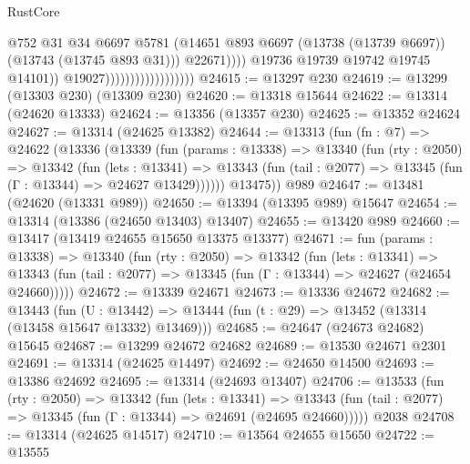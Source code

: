 \begin{lexlean}{RustCore}
\begin{coremodule}
                                                    @752
                                                    @31
                                                    @34
                                                    @6697
                                                    @5781
                                                    (@14651
                                                      @893
                                                      @6697
                                                      (@13738 (@13739 @6697))
                                                      (@13743 (@13745 @893 @31)))
                                                    @22671))))
                                            @19736
                                            @19739
                                            @19742
                                            @19745
                                            @14101))
                                        @19027))))))))))))))))))
@24615 := @13297 @230
@24619 := @13299 (@13303 @230) (@13309 @230)
@24620 := @13318 @15644
@24622 := @13314 (@24620 @13333)
@24624 := @13356 (@13357 @230)
@24625 := @13352 @24624
@24627 := @13314 (@24625 @13382)
@24644 := @13313
    (fun (fn : @7) =>
    @24622
      (@13336
        (@13339
          (fun (params : @13338) =>
          @13340
            (fun (rty : @2050) =>
            @13342
              (fun (lets : @13341) =>
              @13343 (fun (tail : @2077) => @13345 (fun (Γ : @13344) => @24627 @13429))))))
        @13475))
    @989
@24647 := @13481 (@24620 (@13331 @989))
@24650 := @13394 (@13395 @989) @15647
@24654 := @13314 (@13386 (@24650 @13403) @13407)
@24655 := @13420 @989
@24660 := @13417 (@13419 @24655 @15650 @13375 @13377)
@24671 := fun (params : @13338) =>
  @13340
    (fun (rty : @2050) =>
    @13342
      (fun (lets : @13341) =>
      @13343 (fun (tail : @2077) => @13345 (fun (Γ : @13344) => @24627 (@24654 @24660)))))
@24672 := @13339 @24671
@24673 := @13336 @24672
@24682 := @13443
    (fun (U : @13442) => @13444 (fun (t : @29) => @13452 (@13314 (@13458 @15647 @13332) @13469)))
@24685 := @24647 (@24673 @24682) @15645
@24687 := @13299 @24672 @24682
@24689 := @13530 @24671 @2301
@24691 := @13314 (@24625 @14497)
@24692 := @24650 @14500
@24693 := @13386 @24692
@24695 := @13314 (@24693 @13407)
@24706 := @13533
    (fun (rty : @2050) =>
    @13342
      (fun (lets : @13341) =>
      @13343 (fun (tail : @2077) => @13345 (fun (Γ : @13344) => @24691 (@24695 @24660)))))
    @2038
@24708 := @13314 (@24625 @14517)
@24710 := @13564 @24655 @15650
@24722 := @13555

\end{coremodule}
\end{lexlean}

